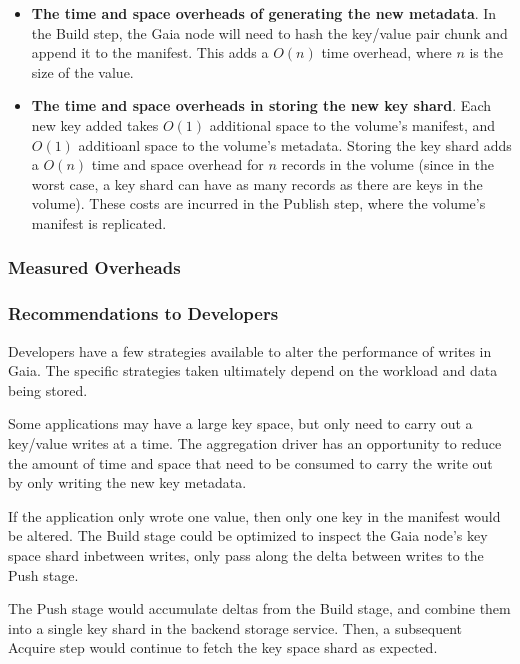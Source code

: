 \begin{itemize}
\item \textbf{The time and space overheads of generating the new metadata}.  In
the Build step, the Gaia node will need to hash the key/value pair
chunk and append it to the manifest.  This adds a $O(n)$ time overhead, where
$n$ is the size of the value.
\item \textbf{The time and space overheads in storing the new key shard}.  Each new
key added takes $O(1)$ additional space to the volume's manifest, and $O(1)$
additioanl space to the volume's metadata.
Storing the key shard adds a $O(n)$ time and space overhead for $n$ records in the volume
(since in the worst case, a key shard can have as many records as there are
keys in the volume).  These costs are incurred in the Publish step, where the
volume's manifest is replicated.
\end{itemize}

\subsubsection{Measured Overheads}


\subsubsection{Recommendations to Developers}

Developers have a few strategies available to alter the performance of writes in Gaia.
The specific strategies taken ultimately depend on the workload and data being
stored.


Some applications may have a large key space, but only need to carry out a
key/value writes at a time.
The aggregation driver has an opportunity to reduce the amount of time and space that
need to be consumed to carry the write out by only writing the new key metadata.

If the application only wrote one value, then only one key in the manifest would
be altered.  The Build stage could be optimized to inspect the Gaia node's 
key space shard inbetween writes, only pass along the delta between writes
to the Push stage.

The Push stage would accumulate deltas from the Build stage, and combine them
into a single key shard in the backend storage service.  Then, a subsequent
Acquire step would continue to fetch the key space shard as expected.

